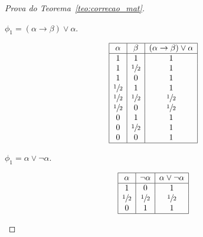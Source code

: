 \begin{proof}[Prova do Teorema~\ref{teo:correcao_mat}]
\begin{provaporcasos}
\begin{provaporsubcasos}
                
                    
                \subcasodeprova{} $\phi_{1} = (\alpha \to \beta) \lor \alpha$. 

                \begin{center}
                    \[
                        \begin{array}{|c|c|c|}%
                            \hline%
                            \alpha      & \beta & (\alpha \to \beta) \lor \alpha \\
                            \hline%
                            1 & 1 & 1\\
                            1 & \meio{} & 1\\
                            1 & 0 & 1\\
                            \meio{} & 1 & 1\\
                            \meio{} & \meio{} & \meio{}\\
                            \meio{} & 0 & \meio{}\\
                            0 & 1 & 1\\
                            0 & \meio{} & 1\\
                            0 & 0 & 1\\
                            \hline%
                        \end{array}
                    \]
                \end{center}
                    

                \subcasodeprova{} $\phi_{1} = \alpha \lor \neg \alpha$. 

                \begin{center}
                    \[
                        \begin{array}{|c|c|c|}%
                            \hline%
                            \alpha      & \neg \alpha & \alpha \lor \neg \alpha \\
                            \hline%
                            1 & 0 & 1\\
                            \meio{} & \meio{} & \meio{}\\
                            0 & 1 & 1\\
                            \hline%
                        \end{array}
                    \]
                \end{center}
                

\end{provaporsubcasos}
\end{provaporcasos}
\end{proof}
